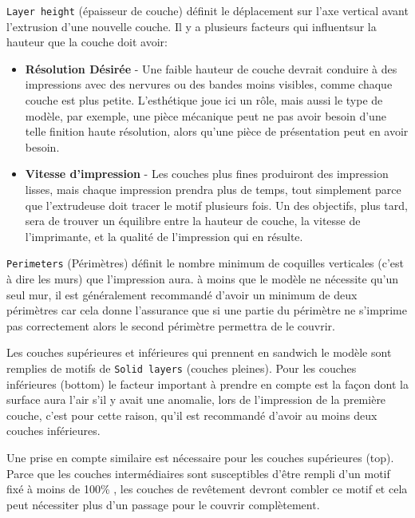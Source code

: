 \texttt{Layer height} (\'epaisseur de couche) d\'efinit le d\'eplacement sur l'axe vertical avant l'extrusion d'une nouvelle couche.  Il y a plusieurs facteurs qui influentsur la hauteur que la couche doit avoir:
\begin{itemize}
	\item \textbf{R\'esolution D\'esir\'ee}  - Une faible hauteur de couche devrait conduire \`a des impressions avec des nervures ou des bandes moins visibles, comme chaque couche est plus petite. L'esth\'etique joue ici un r\^ole, mais aussi le type de mod\`ele, par exemple, une pi\`ece m\'ecanique peut ne pas avoir besoin d'une telle finition haute r\'esolution, alors qu'une pi\`ece de pr\'esentation peut en avoir besoin.
	\item \textbf{Vitesse d'impression}  - Les couches plus fines produiront des impression lisses, mais chaque impression prendra plus de temps, tout simplement parce que l'extrudeuse doit tracer le motif plusieurs fois. Un des objectifs, plus tard, sera de trouver un \'equilibre entre la hauteur de couche, la vitesse de l'imprimante, et la qualit\'e de l'impression qui en r\'esulte.
\end{itemize}
\texttt{Perimeters} (P\'erim\`etres) d\'efinit le nombre minimum de coquilles verticales (c'est \`a dire les murs) que l'impression aura. \`a moins que le mod\`ele ne n\'ecessite qu'un seul mur, il est g\'en\'eralement recommand\'e d'avoir un minimum de deux p\'erim\`etres car cela donne l'assurance que si une partie du p\'erim\`etre ne s'imprime pas correctement alors le second p\'erim\`etre permettra de le couvrir.

Les couches sup\'erieures et inf\'erieures qui prennent en sandwich le mod\`ele sont remplies de motifs de \texttt{Solid layers} (couches pleines). Pour les couches inf\'erieures (bottom) le facteur important \`a prendre en compte est la façon dont la surface aura l'air s'il y avait une anomalie, lors de l'impression de la premi\`ere couche, c'est pour cette raison, qu'il est recommand\'e d'avoir au moins deux couches inf\'erieures.

Une prise en compte similaire est n\'ecessaire pour les couches sup\'erieures (top). Parce que les couches interm\'ediaires sont susceptibles d'\^etre rempli d'un motif fix\'e \`a moins de 100\% , les couches de rev\^etement devront combler ce motif et cela peut n\'ecessiter plus d'un passage pour le couvrir compl\`etement.

